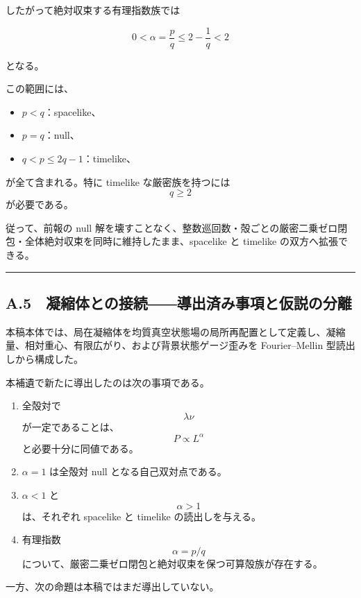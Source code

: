 \documentclass[
  a4paper,
]{ltjsarticle}
\providecommand{\tightlist}{%
  \setlength{\itemsep}{0pt}\setlength{\parskip}{0pt}}
\begin{document}
したがって絶対収束する有理指数族では

\[
\boxed{
0<\alpha
=
\frac pq
\le
2-
\frac1q
<2
}
\tag{A24}
\]

となる。

この範囲には、

\begin{itemize}
\tightlist
\item
  \(p<q\)：spacelike、
\item
  \(p=q\)：null、
\item
  \(q<p\le2q-1\)：timelike、
\end{itemize}

が全て含まれる。特に timelike な厳密族を持つには \[q\ge2\]
が必要である。

従って、前報の null
解を壊すことなく、整数巡回数・殻ごとの厳密二乗ゼロ閉包・全体絶対収束を同時に維持したまま、spacelike
と timelike の双方へ拡張できる。

\begin{center}\rule{0.5\linewidth}{0.5pt}\end{center}

\subsection{A.5　凝縮体との接続――導出済み事項と仮説の分離}\label{a.5-ux51ddux7e2eux4f53ux3068ux306eux63a5ux7d9aux5c0eux51faux6e08ux307fux4e8bux9805ux3068ux4eeeux8aacux306eux5206ux96e2}

本稿本体では、局在凝縮体を均質真空状態場の局所再配置として定義し、凝縮量、相対重心、有限広がり、および背景状態ゲージ歪みを
Fourier--Mellin 型読出しから構成した。

本補遺で新たに導出したのは次の事項である。

\begin{enumerate}
\def\labelenumi{\arabic{enumi}.}
\tightlist
\item
  全殻対で \[\lambda\nu\] が一定であることは、\[P\propto L^\alpha\]
  と必要十分に同値である。
\item
  \(\alpha=1\) は全殻対 null となる自己双対点である。
\item
  \(\alpha<1\) と \[\alpha>1\] は、それぞれ spacelike と timelike
  の読出しを与える。
\item
  有理指数 \[\alpha=p/q\]
  について、厳密二乗ゼロ閉包と絶対収束を保つ可算殻族が存在する。
\end{enumerate}

一方、次の命題は本稿ではまだ導出していない。
\end{document}
